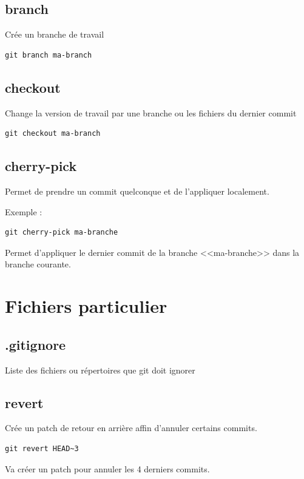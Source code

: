 \documentclass[a4paper]{article}
\begin{document}
\subsection*{branch}
Crée un branche de travail
\begin{verbatim}
git branch ma-branch
\end{verbatim}

\subsection*{checkout}
Change la version de travail par une branche ou les fichiers du dernier commit
\begin{verbatim}
git checkout ma-branch
\end{verbatim}

\subsection*{cherry-pick}
Permet de prendre un commit quelconque et de l'appliquer localement.

Exemple : 
\begin{verbatim}
git cherry-pick ma-branche
\end{verbatim}
Permet d'appliquer le dernier commit de la branche <<ma-branche>> dans la branche courante.

\section{Fichiers particulier}

\subsection*{.gitignore}
Liste des fichiers ou répertoires que git doit ignorer

\subsection*{revert}
Crée un patch de retour en arrière affin d'annuler certains commits.

\begin{verbatim}
git revert HEAD~3
\end{verbatim}
Va créer un patch pour annuler les 4 derniers commits.
\end{document}
